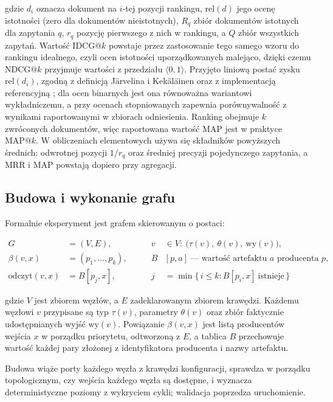 gdzie $d_i$ oznacza dokument na $i$-tej pozycji rankingu, $\mathrm{rel}(d)$ jego ocenę istotności
(zero dla dokumentów nieistotnych), $R_q$ zbiór dokumentów istotnych dla zapytania $q$, $r_q$
pozycję pierwszego z nich w rankingu, a $Q$ zbiór wszystkich zapytań. Wartość $\text{IDCG@}k$
powstaje przez zastosowanie tego samego wzoru do rankingu idealnego, czyli ocen istotności
uporządkowanych malejąco, dzięki czemu $\text{NDCG@}k$ przyjmuje wartości z przedziału
$\langle 0, 1 \rangle$. Przyjęto liniową postać zysku $\mathrm{rel}(d_i)$, zgodną z definicją Järvelina i Kekäläinen
\cite{jarvelin2002cumulated} oraz z implementacją referencyjną \cite{vangysel2018pytrec}; dla ocen binarnych
jest ona równoważna wariantowi wykładniczemu, a przy ocenach stopniowanych zapewnia
porównywalność z wynikami raportowanymi w zbiorach odniesienia. Ranking obejmuje $k$ zwróconych
dokumentów, więc raportowana wartość MAP jest w praktyce MAP@$k$. W obliczeniach elementowych używa się składników powyższych średnich:
odwrotnej pozycji $1/r_q$ oraz średniej precyzji pojedynczego zapytania, a MRR i MAP powstają
dopiero przy agregacji.

\subsection{Budowa i wykonanie grafu}
Formalnie eksperyment jest grafem skierowanym o postaci:

\begin{equation}
\begin{aligned}
G &= (V, E),
&\qquad
v &\in V:\ \big(\tau(v),\ \theta(v),\ \mathrm{wy}(v)\big), \\[3pt]
\beta(v, x) &= (p_1, \dots, p_k),
&\qquad
B&[p, a] \ \text{--- wartość artefaktu } a \text{ producenta } p, \\[3pt]
\mathrm{odczyt}(v, x) &= B[p_j, x],
&\qquad
j &= \min\{\, i \le k : B[p_i, x] \ \text{istnieje} \,\}
\end{aligned}
\label{eq:graf}
\end{equation}

gdzie $V$ jest zbiorem węzłów, a $E$ zadeklarowanym zbiorem krawędzi. Każdemu węzłowi $v$
przypisane są typ $\tau(v)$, parametry $\theta(v)$ oraz zbiór faktycznie udostępnianych wyjść
$\mathrm{wy}(v)$. Powiązanie $\beta(v, x)$ jest listą producentów wejścia $x$ w porządku
priorytetu, odtworzoną z $E$, a tablica $B$ przechowuje wartość każdej pary złożonej z
identyfikatora producenta i nazwy artefaktu. 

Budowa wiąże porty każdego węzła z krawędzi konfiguracji, sprawdza w porządku topologicznym, czy
wejścia każdego węzła są dostępne, i wyznacza deterministyczne poziomy z wykryciem cykli;
walidacja poprzedza uruchomienie.

